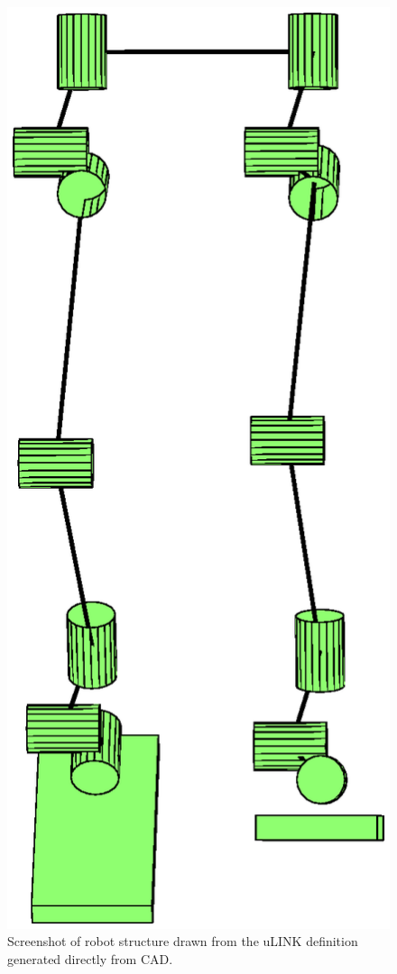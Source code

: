 \begin{figure}[!ht]
	\begin{center}
    \includegraphics[scale=0.6]{fig/design/ulinkdrawn.eps}
	\end{center}
  \caption{Screenshot of robot structure drawn from the uLINK definition generated directly from CAD.}
  \label{fig:ulinkdrawn}
\end{figure}

